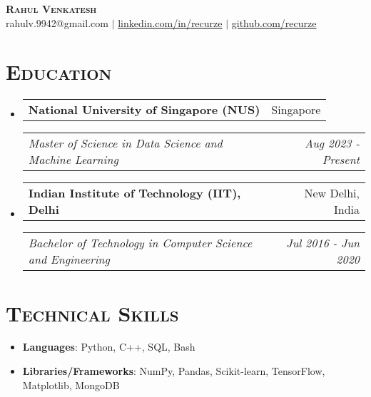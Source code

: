 \documentclass[11pt]{article}
\makeatletter
\newcommand{\headerrow}[2]
{\begin{tabular*}{\linewidth}{l@{\extracolsep{\fill}}r}
    #1 &
    #2 \\
\end{tabular*}}
\makeatother
\begin{document}
\thispagestyle{empty}

\begin{center}
    {\huge \textsc{\textbf{Rahul Venkatesh}}} \\[2pt]
    rahulv.9942@gmail.com
    $\mid$
    \href{https://www.linkedin.com/in/recurze}{linkedin.com/in/recurze}
    $\mid$
    \href{https://github.com/recurze}{github.com/recurze}
\end{center}

\section*{\textsc{\textbf{Education}}}
\begin{itemize}[leftmargin=0em]

\item[]
    \headerrow {\textbf{National University of Singapore (NUS)}}{Singapore}
    \headerrow {\emph{Master of Science in Data Science and Machine Learning}}{\emph{Aug 2023 - Present}}

\item[]
    \headerrow {\textbf{Indian Institute of Technology (IIT), Delhi}}{New Delhi, India}
    \headerrow {\emph{Bachelor of Technology in Computer Science and Engineering}}{\emph{Jul 2016 - Jun 2020}}

\end{itemize}

\section*{\textsc{\textbf{Technical Skills}}}
\begin{itemize}[itemsep=0em, leftmargin=0.7em]
\item[]
    \textbf{Languages}: Python, C++, SQL, Bash
\item[]
    \textbf{Libraries/Frameworks}: NumPy, Pandas, Scikit-learn, TensorFlow, Matplotlib, MongoDB
\end{itemize}
\end{document}
